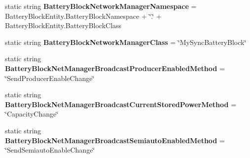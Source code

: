 \begin{DoxyCompactItemize}
\item 
\hypertarget{class_s_e_mod_a_p_i_internal_1_1_a_p_i_1_1_entity_1_1_sector_1_1_sector_object_1_1_cube_grid_1_1d727a14220007a281c99a2418d07055f_adb806f5e058cdaa9c85ed5302f6db8d8}{}static string {\bfseries Battery\+Block\+Network\+Manager\+Namespace} = Battery\+Block\+Entity.\+Battery\+Block\+Namespace + \char`\"{}.\char`\"{} + Battery\+Block\+Entity.\+Battery\+Block\+Class\label{class_s_e_mod_a_p_i_internal_1_1_a_p_i_1_1_entity_1_1_sector_1_1_sector_object_1_1_cube_grid_1_1d727a14220007a281c99a2418d07055f_adb806f5e058cdaa9c85ed5302f6db8d8}

\item 
\hypertarget{class_s_e_mod_a_p_i_internal_1_1_a_p_i_1_1_entity_1_1_sector_1_1_sector_object_1_1_cube_grid_1_1d727a14220007a281c99a2418d07055f_aa9e1f413202b01d4782b59c066717c88}{}static string {\bfseries Battery\+Block\+Network\+Manager\+Class} = \char`\"{}My\+Sync\+Battery\+Block\char`\"{}\label{class_s_e_mod_a_p_i_internal_1_1_a_p_i_1_1_entity_1_1_sector_1_1_sector_object_1_1_cube_grid_1_1d727a14220007a281c99a2418d07055f_aa9e1f413202b01d4782b59c066717c88}

\item 
\hypertarget{class_s_e_mod_a_p_i_internal_1_1_a_p_i_1_1_entity_1_1_sector_1_1_sector_object_1_1_cube_grid_1_1d727a14220007a281c99a2418d07055f_aceabd7482073fd50d7d944b8503aef5c}{}static string {\bfseries Battery\+Block\+Net\+Manager\+Broadcast\+Producer\+Enabled\+Method} = \char`\"{}Send\+Producer\+Enable\+Change\char`\"{}\label{class_s_e_mod_a_p_i_internal_1_1_a_p_i_1_1_entity_1_1_sector_1_1_sector_object_1_1_cube_grid_1_1d727a14220007a281c99a2418d07055f_aceabd7482073fd50d7d944b8503aef5c}

\item 
\hypertarget{class_s_e_mod_a_p_i_internal_1_1_a_p_i_1_1_entity_1_1_sector_1_1_sector_object_1_1_cube_grid_1_1d727a14220007a281c99a2418d07055f_acc50218dabb5c98de299a4aa236c5cf1}{}static string {\bfseries Battery\+Block\+Net\+Manager\+Broadcast\+Current\+Stored\+Power\+Method} = \char`\"{}Capacity\+Change\char`\"{}\label{class_s_e_mod_a_p_i_internal_1_1_a_p_i_1_1_entity_1_1_sector_1_1_sector_object_1_1_cube_grid_1_1d727a14220007a281c99a2418d07055f_acc50218dabb5c98de299a4aa236c5cf1}

\item 
\hypertarget{class_s_e_mod_a_p_i_internal_1_1_a_p_i_1_1_entity_1_1_sector_1_1_sector_object_1_1_cube_grid_1_1d727a14220007a281c99a2418d07055f_ad29ea97b9d1b5403a841ec611b24b230}{}static string {\bfseries Battery\+Block\+Net\+Manager\+Broadcast\+Semiauto\+Enabled\+Method} = \char`\"{}Send\+Semiauto\+Enable\+Change\char`\"{}\label{class_s_e_mod_a_p_i_internal_1_1_a_p_i_1_1_entity_1_1_sector_1_1_sector_object_1_1_cube_grid_1_1d727a14220007a281c99a2418d07055f_ad29ea97b9d1b5403a841ec611b24b230}


\end{DoxyCompactItemize}
